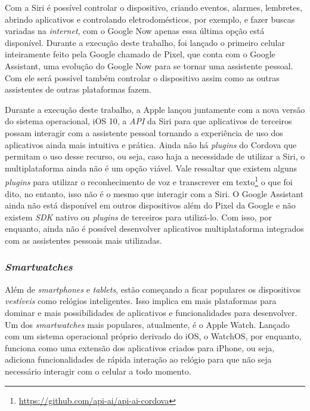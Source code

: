 Com a Siri é possível controlar o dispositivo, criando eventos, alarmes, lembretes, abrindo aplicativos e controlando eletrodomésticos, por exemplo, e fazer buscas variadas na \textit{internet}, com o Google Now 
apenas essa última opção está disponível. Durante a execução deste trabalho, foi lançado o primeiro celular inteiramente feito pela Google chamado de Pixel, que conta com o Google Assistant, uma evolução do Google Now 
para se tornar uma assistente pessoal. Com ele será possível também controlar o dispositivo assim como as outras assistentes de outras plataformas fazem. 

Durante a execução deste trabalho, a Apple lançou juntamente com a nova versão do sistema operacional, iOS 10, a \textit{API} da Siri para que aplicativos de terceiros possam interagir com a assistente pessoal tornando 
a experiência de uso dos aplicativos ainda mais intuitiva e prática. Ainda não há \textit{plugins} do Cordova que permitam o uso desse recurso, ou seja, caso haja a necessidade de utilizar a Siri, o multiplataforma ainda 
não é um opção viável. Vale ressaltar que existem alguns \textit{plugins} para utilizar o reconhecimento de voz e transcrever em texto\footnote{\url{https://github.com/api-ai/api-ai-cordova}} o que foi dito, no entanto, 
isso não é o mesmo que interagir com a Siri. O Google Assistant ainda não está disponível em outros dispositivos além do Pixel da Google e não existem \textit{SDK} nativo ou \textit{plugins} de terceiros para utilizá-lo. 
Com isso, por enquanto, ainda não é possível desenvolver aplicativos multiplataforma integrados com as assistentes pessoais mais utilizadas.

\subsubsection{\textit{Smartwatches}} \label{subsubsec:facial}

Além de \textit{smartphones} e \textit{tablets}, estão começando a ficar populares os dispositivos \textit{vestíveis} como relógios inteligentes. Isso implica em mais plataformas para dominar 
e mais possibilidades de aplicativos e funcionalidades para desenvolver. Um dos \textit{smartwatches} mais populares, atualmente, é o Apple Watch. Lançado com um sistema operacional próprio derivado do iOS, o WatchOS, 
por enquanto, funciona como uma extensão dos aplicativos criados para iPhone, ou seja, adiciona funcionalidades de rápida interação ao relógio para que não seja necessário interagir com o celular a todo momento.

